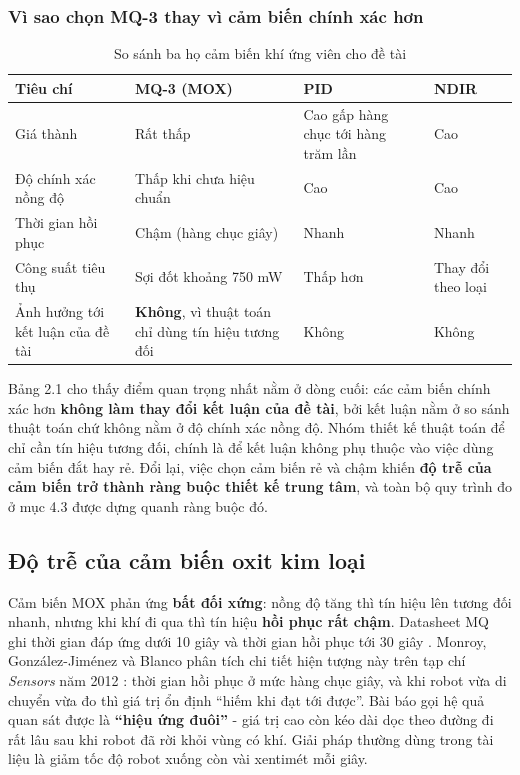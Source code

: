 \subsubsection{Vì sao chọn MQ-3 thay vì cảm biến chính xác hơn}
\begin{table}[!htbp]
  \centering
  \caption{So sánh ba họ cảm biến khí ứng viên cho đề tài}
  \small
  \renewcommand{\arraystretch}{1.25}
  \begin{tabular}{>{\raggedright\arraybackslash}p{}>{\raggedright\arraybackslash}p{}>{\raggedright\arraybackslash}p{}>{\raggedright\arraybackslash}p{}}
    \toprule
    \textbf{Tiêu chí} & \textbf{MQ-3 (MOX)} & \textbf{PID} & \textbf{NDIR} \\
    \midrule
    Giá thành & Rất thấp & Cao gấp hàng chục tới hàng trăm lần & Cao \\
    Độ chính xác nồng độ & Thấp khi chưa hiệu chuẩn & Cao & Cao \\
    Thời gian hồi phục & Chậm (hàng chục giây) & Nhanh & Nhanh \\
    Công suất tiêu thụ & Sợi đốt khoảng 750 mW & Thấp hơn & Thay đổi theo loại \\
    Ảnh hưởng tới kết luận của đề tài & \textbf{Không}, vì thuật toán chỉ dùng tín hiệu tương đối & Không & Không \\
    \bottomrule
  \end{tabular}
\end{table}
Bảng 2.1 cho thấy điểm quan trọng nhất nằm ở dòng cuối: các cảm biến chính xác hơn \textbf{không làm thay đổi kết luận của đề tài}, bởi kết luận nằm ở so sánh thuật toán chứ không nằm ở độ chính xác nồng độ. Nhóm thiết kế thuật toán để chỉ cần tín hiệu tương đối, chính là để kết luận không phụ thuộc vào việc dùng cảm biến đắt hay rẻ. Đổi lại, việc chọn cảm biến rẻ và chậm khiến \textbf{độ trễ của cảm biến trở thành ràng buộc thiết kế trung tâm}, và toàn bộ quy trình đo ở mục 4.3 được dựng quanh ràng buộc đó.


\subsection{Độ trễ của cảm biến oxit kim loại}
Cảm biến MOX phản ứng \textbf{bất đối xứng}: nồng độ tăng thì tín hiệu lên tương đối nhanh, nhưng khi khí đi qua thì tín hiệu \textbf{hồi phục rất chậm}. Datasheet MQ ghi thời gian đáp ứng dưới 10 giây và thời gian hồi phục tới 30 giây \cite{r7}. Monroy, González-Jiménez và Blanco phân tích chi tiết hiện tượng này trên tạp chí \textit{Sensors} năm 2012 \cite{r3}: thời gian hồi phục ở mức hàng chục giây, và khi robot vừa di chuyển vừa đo thì giá trị ổn định ``hiếm khi đạt tới được''. Bài báo gọi hệ quả quan sát được là \textbf{``hiệu ứng đuôi''} - giá trị cao còn kéo dài dọc theo đường đi rất lâu sau khi robot đã rời khỏi vùng có khí. Giải pháp thường dùng trong tài liệu là giảm tốc độ robot xuống còn vài xentimét mỗi giây.

